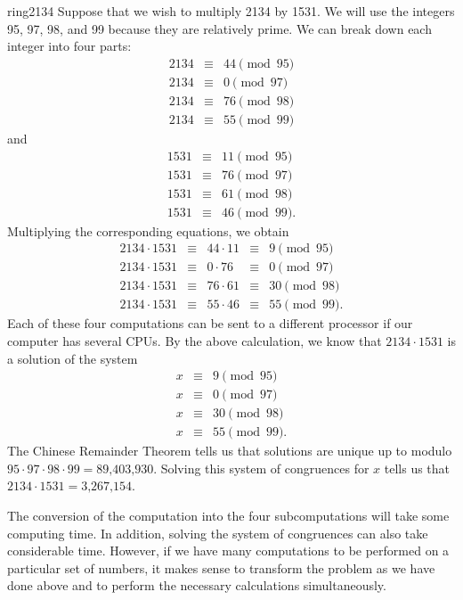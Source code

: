  
\begin{example}{ring2134}
Suppose that we wish to multiply 2134 by 1531. We will use the integers
95, 97, 98, and 99 because they are relatively prime. We can break down
each integer into four parts:
\begin{eqnarray*}
2134 & \equiv & 44 \pmod{95} \\
2134 & \equiv & 0 \pmod{97} \\
2134 & \equiv & 76 \pmod{98} \\
2134 & \equiv & 55 \pmod{99} 
\end{eqnarray*}
and
\begin{eqnarray*}
1531 & \equiv & 11 \pmod{95} \\
1531 & \equiv & 76 \pmod{97} \\
1531 & \equiv & 61 \pmod{98} \\
1531 & \equiv & 46 \pmod{99}. 
\end{eqnarray*}
Multiplying the corresponding equations, we obtain
\[
\begin{array}{rcccl}
2134 \cdot 1531 & \equiv & 44 \cdot 11 & \equiv & 9 \pmod{95} \\
2134 \cdot 1531 & \equiv & 0  \cdot 76 & \equiv & 0 \pmod{97} \\
2134 \cdot 1531 & \equiv & 76 \cdot 61 & \equiv & 30 \pmod{98} \\
2134 \cdot 1531 & \equiv & 55 \cdot 46 & \equiv & 55 \pmod{99}. 
\end{array}
\]
Each of these four computations can be sent to a different processor
if our computer has several CPUs. By the above calculation, we know
that \mbox{$2134 \cdot 1531$} is a solution of the system
\begin{eqnarray*}
x & \equiv & 9 \pmod{95} \\
x & \equiv & 0 \pmod{97} \\
x & \equiv & 30 \pmod{98} \\
x & \equiv & 55 \pmod{99}. 
\end{eqnarray*}
The Chinese Remainder Theorem tells us that solutions are unique up to
modulo $95 \cdot 97 \cdot 98 \cdot 99 = \mbox{89,403,930}$. Solving
this system of congruences for $x$ tells us that $2134 \cdot 1531 =
\mbox{3,267,154}$.  
 
 
The conversion of the computation into the four subcomputations will
take some computing time.  In addition, solving the system of
congruences can also take considerable time.  However, if we have
many computations to be performed on a particular set of numbers, it
makes sense to transform the problem as we have done above and to perform
the necessary calculations simultaneously.
\end{example}
 

